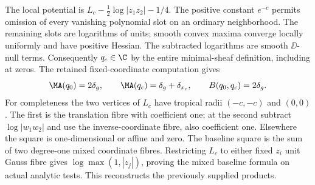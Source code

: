 The local potential is $L_c-\frac12\log|z_1z_2|-1/4$. The positive
constant $e^{-c}$ permits omission of every vanishing polynomial slot on
an ordinary neighborhood. The remaining slots are logarithms of units;
smooth convex maxima converge locally uniformly and have positive Hessian.
The subtracted logarithms are smooth $\DD$-null terms. Consequently
$q_c\in\C$ by the entire minimal-sheaf definition, including at zeros.
The retained fixed-coordinate computation gives
\[
 \MA(q_0)=2\delta_g,\qquad \MA(q_c)=\delta_g+\delta_{x_c},
 \qquad B(q_0,q_c)=2\delta_g.
\]
For completeness the two vertices of $L_c$ have tropical radii
$(-c,-c)$ and $(0,0)$. The first is the translation fibre with coefficient
one; at the second subtract $\log|w_1w_2|$ and use the inverse-coordinate
fibre, also coefficient one. Elsewhere the square is one-dimensional or
affine and zero. The baseline square is the sum of two degree-one mixed
coordinate fibres. Restricting $L_c$ to either fixed $z_i$ unit Gauss fibre
gives $\log\max(1,|z_j|)$, proving the mixed baseline formula on actual
analytic tests. This reconstructs the previously supplied products.

